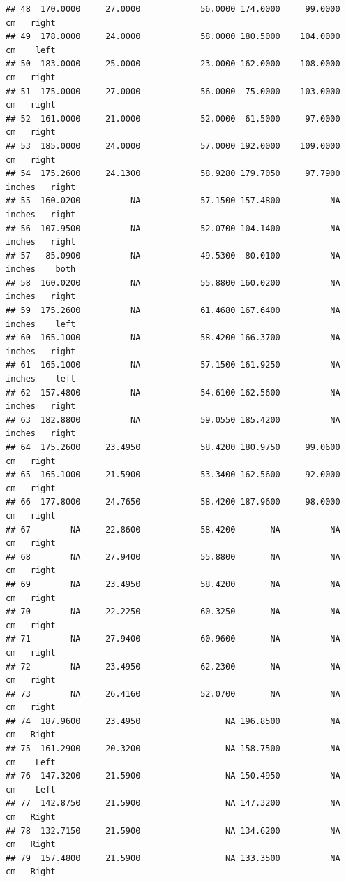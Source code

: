 \documentclass[]{article}
\begin{document}
\begin{verbatim}
## 48  170.0000     27.0000            56.0000 174.0000     99.0000     cm   right
## 49  178.0000     24.0000            58.0000 180.5000    104.0000     cm    left
## 50  183.0000     25.0000            23.0000 162.0000    108.0000     cm   right
## 51  175.0000     27.0000            56.0000  75.0000    103.0000     cm   right
## 52  161.0000     21.0000            52.0000  61.5000     97.0000     cm   right
## 53  185.0000     24.0000            57.0000 192.0000    109.0000     cm   right
## 54  175.2600     24.1300            58.9280 179.7050     97.7900 inches   right
## 55  160.0200          NA            57.1500 157.4800          NA inches   right
## 56  107.9500          NA            52.0700 104.1400          NA inches   right
## 57   85.0900          NA            49.5300  80.0100          NA inches    both
## 58  160.0200          NA            55.8800 160.0200          NA inches   right
## 59  175.2600          NA            61.4680 167.6400          NA inches    left
## 60  165.1000          NA            58.4200 166.3700          NA inches   right
## 61  165.1000          NA            57.1500 161.9250          NA inches    left
## 62  157.4800          NA            54.6100 162.5600          NA inches   right
## 63  182.8800          NA            59.0550 185.4200          NA inches   right
## 64  175.2600     23.4950            58.4200 180.9750     99.0600     cm   right
## 65  165.1000     21.5900            53.3400 162.5600     92.0000     cm   right
## 66  177.8000     24.7650            58.4200 187.9600     98.0000     cm   right
## 67        NA     22.8600            58.4200       NA          NA     cm   right
## 68        NA     27.9400            55.8800       NA          NA     cm   right
## 69        NA     23.4950            58.4200       NA          NA     cm   right
## 70        NA     22.2250            60.3250       NA          NA     cm   right
## 71        NA     27.9400            60.9600       NA          NA     cm   right
## 72        NA     23.4950            62.2300       NA          NA     cm   right
## 73        NA     26.4160            52.0700       NA          NA     cm   right
## 74  187.9600     23.4950                 NA 196.8500          NA     cm   Right
## 75  161.2900     20.3200                 NA 158.7500          NA     cm    Left
## 76  147.3200     21.5900                 NA 150.4950          NA     cm    Left
## 77  142.8750     21.5900                 NA 147.3200          NA     cm   Right
## 78  132.7150     21.5900                 NA 134.6200          NA     cm   Right
## 79  157.4800     21.5900                 NA 133.3500          NA     cm   Right

\end{verbatim}
\end{document}
